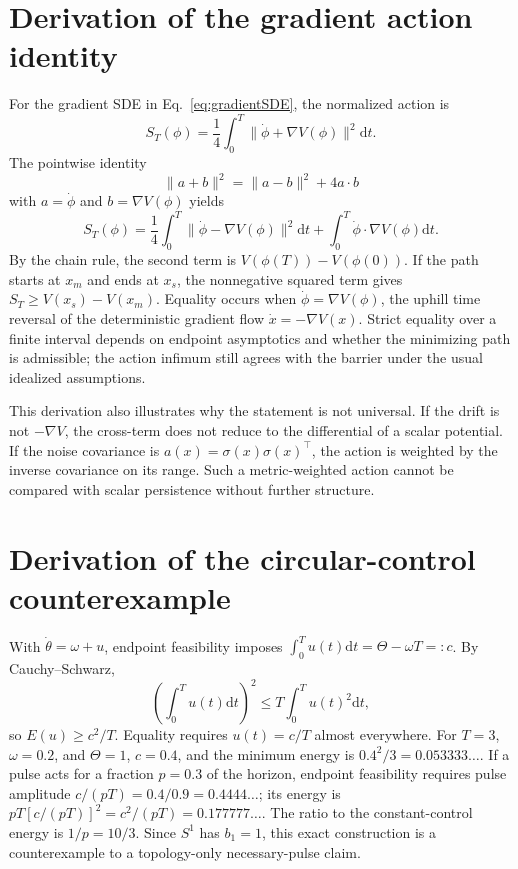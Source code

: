 \documentclass[11pt]{article}
\newcommand{\D}{\mathrm{d}}
\newcommand{\grad}{\nabla}
\newcommand{\1}{\mathbf{1}}
\begin{document}
\clearpage
\appendix
\section{Derivation of the gradient action identity}
For the gradient SDE in Eq.~\eqref{eq:gradientSDE}, the normalized action is
\begin{equation}
S_T(\phi)=\frac14\int_0^T\|\dot\phi+\grad V(\phi)\|^2\D t.
\end{equation}
The pointwise identity
\begin{equation}
\|a+b\|^2=\|a-b\|^2+4a\cdot b
\end{equation}
with $a=\dot\phi$ and $b=\grad V(\phi)$ yields
\begin{equation}
S_T(\phi)=\frac14\int_0^T\|\dot\phi-\grad V(\phi)\|^2\D t+\int_0^T\dot\phi\cdot\grad V(\phi)\D t.
\end{equation}
By the chain rule, the second term is $V(\phi(T))-V(\phi(0))$. If the path starts at $x_m$ and ends at $x_s$, the nonnegative squared term gives $S_T\geq V(x_s)-V(x_m)$. Equality occurs when $\dot\phi=\grad V(\phi)$, the uphill time reversal of the deterministic gradient flow $\dot x=-\grad V(x)$. Strict equality over a finite interval depends on endpoint asymptotics and whether the minimizing path is admissible; the action infimum still agrees with the barrier under the usual idealized assumptions.

This derivation also illustrates why the statement is not universal. If the drift is not $-\grad V$, the cross-term does not reduce to the differential of a scalar potential. If the noise covariance is $a(x)=\sigma(x)\sigma(x)^\top$, the action is weighted by the inverse covariance on its range. Such a metric-weighted action cannot be compared with scalar persistence without further structure.

\section{Derivation of the circular-control counterexample}
With $\dot\theta=\omega+u$, endpoint feasibility imposes $\int_0^T u(t)\D t=\Theta-\omega T=:c$. By Cauchy--Schwarz,
\begin{equation}
\left(\int_0^T u(t)\D t\right)^2\leq T\int_0^T u(t)^2\D t,
\end{equation}
so $E(u)\geq c^2/T$. Equality requires $u(t)=c/T$ almost everywhere. For $T=3$, $\omega=0.2$, and $\Theta=1$, $c=0.4$, and the minimum energy is $0.4^2/3=0.053333\ldots$. If a pulse acts for a fraction $p=0.3$ of the horizon, endpoint feasibility requires pulse amplitude $c/(pT)=0.4/0.9=0.4444\ldots$; its energy is $pT[c/(pT)]^2=c^2/(pT)=0.177777\ldots$. The ratio to the constant-control energy is $1/p=10/3$. Since $S^1$ has $b_1=1$, this exact construction is a counterexample to a topology-only necessary-pulse claim.
\end{document}
